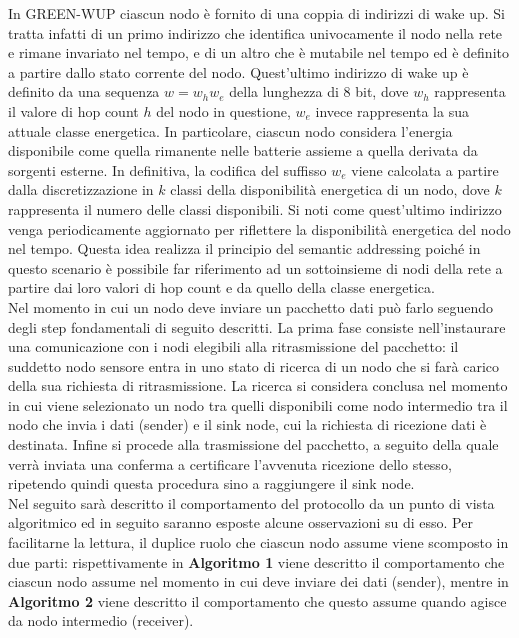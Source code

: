 \documentclass[binding=0.6cm,TFA]{sapthesis}
\begin{document}
In GREEN-WUP ciascun nodo è fornito di una coppia di indirizzi di wake up. Si tratta infatti di un primo indirizzo che identifica univocamente
il nodo nella rete e rimane invariato nel tempo, e di un altro che è mutabile nel tempo ed è definito a partire dallo stato corrente del nodo.
Quest'ultimo indirizzo di wake up è definito da una sequenza $w=w_{h}w_{e}$ della lunghezza di 8 bit, dove $w_{h}$ rappresenta il valore di hop
count $h$ del nodo in questione, $w_{e}$ invece rappresenta la sua attuale classe energetica. In particolare, ciascun nodo considera
l'energia disponibile come quella rimanente nelle batterie assieme a quella derivata da sorgenti esterne. In definitiva, la codifica del suffisso
$w_{e}$ viene calcolata a partire dalla discretizzazione in $k$ classi della disponibilità energetica di un nodo, dove $k$ rappresenta il
numero delle classi disponibili. Si noti come quest'ultimo indirizzo venga periodicamente aggiornato per riflettere la disponibilità
energetica del nodo nel tempo. Questa idea realizza il principio del semantic addressing poiché in questo scenario è possibile far riferimento
ad un sottoinsieme di nodi della rete a partire dai loro valori di hop count e da quello della classe energetica. \\

Nel momento in cui un nodo deve inviare un pacchetto dati può farlo seguendo degli step fondamentali di seguito descritti.
La prima fase consiste nell'instaurare una comunicazione con i nodi elegibili alla ritrasmissione del pacchetto: il suddetto nodo sensore
entra in uno stato di ricerca di un nodo che si farà carico della sua richiesta di ritrasmissione. La ricerca si considera conclusa
nel momento in cui viene selezionato un nodo tra quelli disponibili come nodo intermedio tra il nodo che invia i dati (sender) e il sink
node, cui la richiesta di ricezione dati è destinata. Infine si procede alla trasmissione del pacchetto, a seguito della quale
verrà inviata una conferma a certificare l'avvenuta ricezione dello stesso, ripetendo quindi questa procedura sino a raggiungere
il sink node.\\

Nel seguito sarà descritto il comportamento del protocollo da un punto di vista algoritmico ed in seguito saranno esposte alcune osservazioni su di esso.
Per facilitarne la lettura, il duplice ruolo che ciascun nodo assume viene scomposto in due parti: rispettivamente in \textbf{Algoritmo 1}
viene descritto il comportamento che ciascun nodo assume nel momento in cui deve inviare dei dati (sender), mentre in \textbf{Algoritmo 2}
viene descritto il comportamento che questo assume quando agisce da nodo intermedio (receiver).
\end{document}
